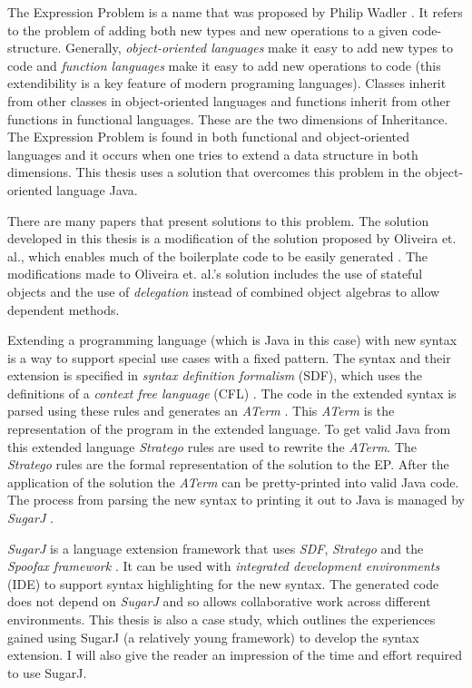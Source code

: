 \documentclass{report}
\begin{document}
The Expression Problem is a name that was proposed by Philip Wadler \cite{Wadler-Expression-1998}. It refers to the problem of adding both new types and new operations to a given code-structure. Generally, \emph{object-oriented languages} make it easy to add new types to code and \emph{function languages} make it easy to add new operations to code (this extendibility is a key feature of modern programing languages). Classes inherit from other classes in object-oriented languages and functions inherit from other functions in functional languages. These are the two dimensions of Inheritance. The Expression Problem is found in both functional and object-oriented languages and it occurs when one tries to extend a data structure in both dimensions. This thesis uses a solution that overcomes this problem in the object-oriented language Java.

There are many papers that present solutions to this problem. The solution developed in this thesis is a modification of the solution proposed by Oliveira et. al., which enables much of the boilerplate code to be  easily generated \cite{Oliv-Extensibility-2012}. The modifications made to Oliveira et. al.'s solution includes the use of stateful objects and the use of \emph{delegation} instead of combined object algebras to allow dependent methods.

Extending a programming language (which is Java in this case) with new syntax is a way to support special use cases with a fixed pattern. The syntax and their extension is specified in \emph{syntax definition formalism} (SDF), which uses the definitions of a \emph{context free language} (CFL) \cite{Heering-SDF-1989}. The code in the extended syntax is parsed using these rules and generates an \emph{ATerm} \cite{Brand-ATerms-2000}. This \emph{ATerm} is the representation of the program in the extended language. To get valid Java from this extended language \emph{Stratego} rules are used to rewrite the \emph{ATerm}. The \emph{Stratego} rules are the formal representation of the solution to the EP. After the application of the solution the \emph{ATerm} can be pretty-printed into valid Java code. The process from parsing the new syntax to printing it out to Java is managed by \emph{SugarJ} \cite{Erdweg-SugarJ-2011}.

\emph{SugarJ} is a language extension framework that uses \emph{SDF}, \emph{Stratego} and the \emph{Spoofax framework} \cite{Kats-Spoofax-2010}. It can be used with \emph{integrated development environments} (IDE) to support syntax highlighting for the new syntax. The generated code does not depend on \emph{SugarJ} and so allows collaborative work across different environments. This thesis is also a case study, which outlines the experiences gained using SugarJ (a relatively young framework) to develop the syntax extension. I will also give the reader an impression of the time and effort required to use SugarJ.
\end{document}
